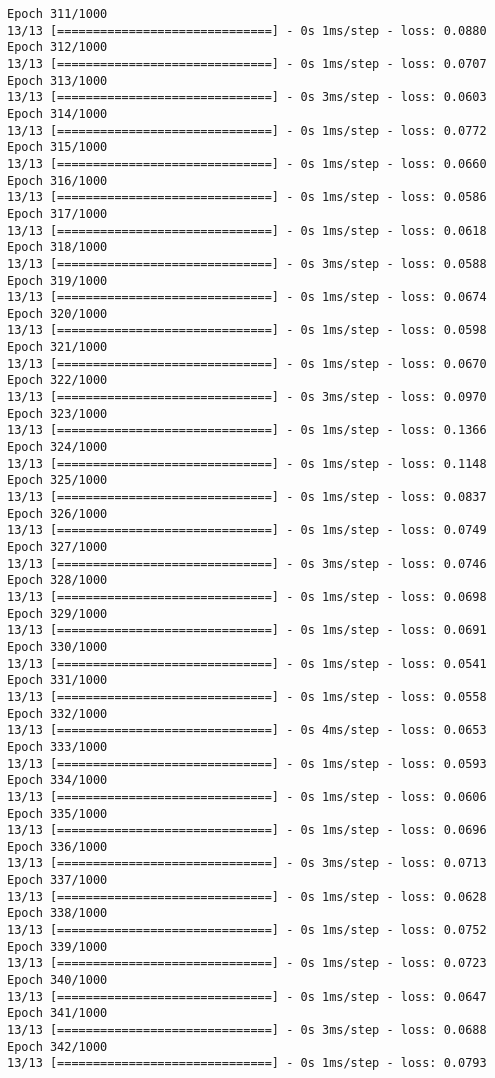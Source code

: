 \documentclass[11pt]{article}
\begin{document}
\begin{Verbatim}[commandchars=\\\{\}]
Epoch 311/1000
13/13 [==============================] - 0s 1ms/step - loss: 0.0880
Epoch 312/1000
13/13 [==============================] - 0s 1ms/step - loss: 0.0707
Epoch 313/1000
13/13 [==============================] - 0s 3ms/step - loss: 0.0603
Epoch 314/1000
13/13 [==============================] - 0s 1ms/step - loss: 0.0772
Epoch 315/1000
13/13 [==============================] - 0s 1ms/step - loss: 0.0660
Epoch 316/1000
13/13 [==============================] - 0s 1ms/step - loss: 0.0586
Epoch 317/1000
13/13 [==============================] - 0s 1ms/step - loss: 0.0618
Epoch 318/1000
13/13 [==============================] - 0s 3ms/step - loss: 0.0588
Epoch 319/1000
13/13 [==============================] - 0s 1ms/step - loss: 0.0674
Epoch 320/1000
13/13 [==============================] - 0s 1ms/step - loss: 0.0598
Epoch 321/1000
13/13 [==============================] - 0s 1ms/step - loss: 0.0670
Epoch 322/1000
13/13 [==============================] - 0s 3ms/step - loss: 0.0970
Epoch 323/1000
13/13 [==============================] - 0s 1ms/step - loss: 0.1366
Epoch 324/1000
13/13 [==============================] - 0s 1ms/step - loss: 0.1148
Epoch 325/1000
13/13 [==============================] - 0s 1ms/step - loss: 0.0837
Epoch 326/1000
13/13 [==============================] - 0s 1ms/step - loss: 0.0749
Epoch 327/1000
13/13 [==============================] - 0s 3ms/step - loss: 0.0746
Epoch 328/1000
13/13 [==============================] - 0s 1ms/step - loss: 0.0698
Epoch 329/1000
13/13 [==============================] - 0s 1ms/step - loss: 0.0691
Epoch 330/1000
13/13 [==============================] - 0s 1ms/step - loss: 0.0541
Epoch 331/1000
13/13 [==============================] - 0s 1ms/step - loss: 0.0558
Epoch 332/1000
13/13 [==============================] - 0s 4ms/step - loss: 0.0653
Epoch 333/1000
13/13 [==============================] - 0s 1ms/step - loss: 0.0593
Epoch 334/1000
13/13 [==============================] - 0s 1ms/step - loss: 0.0606
Epoch 335/1000
13/13 [==============================] - 0s 1ms/step - loss: 0.0696
Epoch 336/1000
13/13 [==============================] - 0s 3ms/step - loss: 0.0713
Epoch 337/1000
13/13 [==============================] - 0s 1ms/step - loss: 0.0628
Epoch 338/1000
13/13 [==============================] - 0s 1ms/step - loss: 0.0752
Epoch 339/1000
13/13 [==============================] - 0s 1ms/step - loss: 0.0723
Epoch 340/1000
13/13 [==============================] - 0s 1ms/step - loss: 0.0647
Epoch 341/1000
13/13 [==============================] - 0s 3ms/step - loss: 0.0688
Epoch 342/1000
13/13 [==============================] - 0s 1ms/step - loss: 0.0793

\end{Verbatim}
\end{document}
